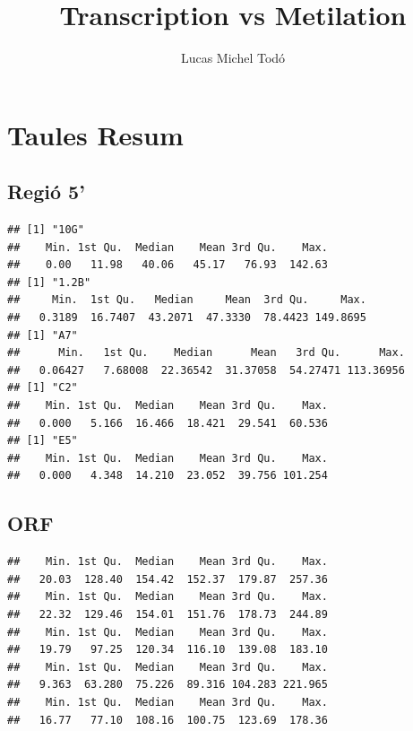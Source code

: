 \documentclass{article}\usepackage[]{graphicx}\usepackage[]{color}
\makeatletter
\newenvironment{kframe}{%
 \def\at@end@of@kframe{}%
 \ifinner\ifhmode%
  \def\at@end@of@kframe{\end{minipage}}%
  \begin{minipage}{\columnwidth}%
 \fi\fi%
 \def\FrameCommand##1{\hskip\@totalleftmargin \hskip-\fboxsep
 \colorbox{shadecolor}{##1}\hskip-\fboxsep
     \hskip-\linewidth \hskip-\@totalleftmargin \hskip\columnwidth}%
 \MakeFramed {\advance\hsize-\width
   \@totalleftmargin\z@ \linewidth\hsize
   \@setminipage}}%
 {\par\unskip\endMakeFramed%
 \at@end@of@kframe}
\newenvironment{knitrout}{}{} %
\makeatother
\begin{document}
\title{Transcription vs Metilation}
\author{Lucas Michel Todó}
\maketitle
\tableofcontents
\clearpage





\section{Taules Resum}
\subsection{Regió 5'}
\begin{knitrout}
\color{fgcolor}\begin{kframe}
\begin{verbatim}
## [1] "10G"
##    Min. 1st Qu.  Median    Mean 3rd Qu.    Max. 
##    0.00   11.98   40.06   45.17   76.93  142.63 
## [1] "1.2B"
##     Min.  1st Qu.   Median     Mean  3rd Qu.     Max. 
##   0.3189  16.7407  43.2071  47.3330  78.4423 149.8695 
## [1] "A7"
##      Min.   1st Qu.    Median      Mean   3rd Qu.      Max. 
##   0.06427   7.68008  22.36542  31.37058  54.27471 113.36956 
## [1] "C2"
##    Min. 1st Qu.  Median    Mean 3rd Qu.    Max. 
##   0.000   5.166  16.466  18.421  29.541  60.536 
## [1] "E5"
##    Min. 1st Qu.  Median    Mean 3rd Qu.    Max. 
##   0.000   4.348  14.210  23.052  39.756 101.254
\end{verbatim}
\end{kframe}
\end{knitrout}
\subsection{ORF}
\begin{knitrout}
\color{fgcolor}\begin{kframe}
\begin{verbatim}
##    Min. 1st Qu.  Median    Mean 3rd Qu.    Max. 
##   20.03  128.40  154.42  152.37  179.87  257.36 
##    Min. 1st Qu.  Median    Mean 3rd Qu.    Max. 
##   22.32  129.46  154.01  151.76  178.73  244.89 
##    Min. 1st Qu.  Median    Mean 3rd Qu.    Max. 
##   19.79   97.25  120.34  116.10  139.08  183.10 
##    Min. 1st Qu.  Median    Mean 3rd Qu.    Max. 
##   9.363  63.280  75.226  89.316 104.283 221.965 
##    Min. 1st Qu.  Median    Mean 3rd Qu.    Max. 
##   16.77   77.10  108.16  100.75  123.69  178.36
\end{verbatim}
\end{kframe}
\end{knitrout}
\end{document}
